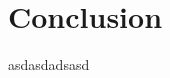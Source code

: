 \documentclass[conference]{IEEEtran}
\begin{document}
%





\section{Conclusion}
asdasdadsasd





%
%
%







\end{document}
